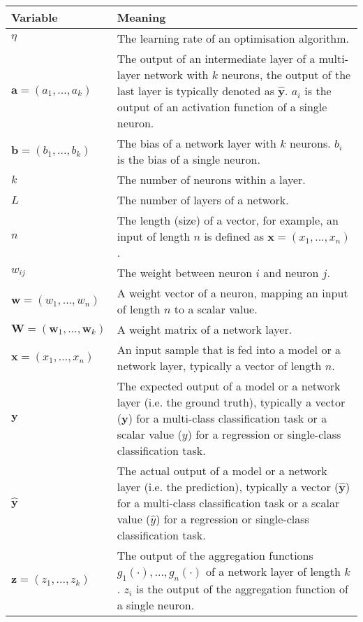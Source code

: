 \begin{tabular}{ p{3cm} p{11cm} }
	\textbf{Variable} & \textbf{Meaning}\\
	\hline
	$\eta$ & The learning rate of an optimisation algorithm.\\
	$\boldsymbol{a} = (a_1, ..., a_k)$ & The output of an intermediate layer of a multi-layer network with $k$ neurons, the output of the last layer is typically denoted as $\boldsymbol{\hat{y}}$. $a_i$ is the output of an activation function of a single neuron.\\
	$\boldsymbol{b} = (b_1, ..., b_k)$ & The bias of a network layer with $k$ neurons. $b_i$ is the bias of a single neuron.\\
    $k$ & The number of neurons within a layer.\\
    $L$ & The number of layers of a network.\\
    $n$ & The length (size) of a vector, for example, an input of length $n$ is defined as $\boldsymbol{x} = (x_1, ..., x_n)$.\\
    $w_{ij}$ & The weight between neuron $i$ and neuron $j$.\\
	$\boldsymbol{w} = (w_1, ..., w_n)$ & A weight vector of a neuron, mapping an input of length $n$ to a scalar value.\\
	$\boldsymbol{W} = (\boldsymbol{w}_1, ..., \boldsymbol{w}_k)$ & A weight matrix of a network layer.\\
    $\boldsymbol{x} = (x_1, ..., x_n)$ & An input sample that is fed into a model or a network layer, typically a vector of length $n$.\\
    $\boldsymbol{y}$ & The expected output of a model or a network layer (i.e. the ground truth), typically a vector ($\boldsymbol{y}$) for a multi-class classification task or a scalar value ($y$) for a regression or single-class classification task.\\
	$\boldsymbol{\hat{y}}$ & The actual output of a model or a network layer (i.e. the prediction), typically a vector ($\boldsymbol{\hat{y}}$) for a multi-class classification task or a scalar value ($\hat{y}$) for a regression or single-class classification task.\\
	$\boldsymbol{z} = (z_1, ..., z_k)$ & The output of the aggregation functions $g_1(\cdot), ..., g_n(\cdot)$ of a network layer of length $k$. $z_i$  is the output of the aggregation function of a single neuron.\\
\end{tabular}


